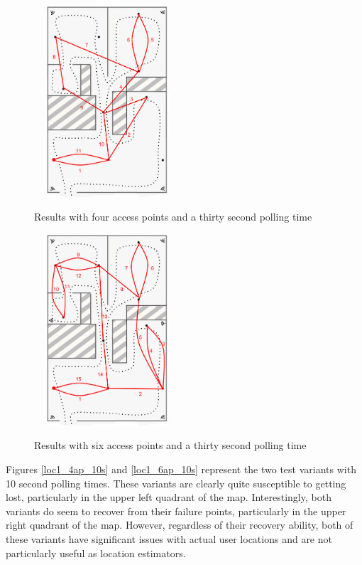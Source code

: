 \begin{figure}
	\centering
	\begin{minipage}{0.45\textwidth}
		\ \includegraphics[width=2in,height=2.8in]{loc1_4ap_30s.png}
		\caption{Results with four access points and a thirty second polling time}
		\label{loc1_4ap_30s}
	\end{minipage}\hfill
	\begin{minipage}{0.45\textwidth}
		\centering
		\ \includegraphics[width=2in,height=2.8in]{loc1_6ap_30s.png}
		\caption{Results with six access points and a thirty second polling time}
		\label{loc1_6ap_30s}
	\end{minipage}
\end{figure}


Figures \ref{loc1_4ap_10s} and \ref{loc1_6ap_10s} represent the two test variants with 10 second polling times. These variants are clearly quite susceptible to getting lost, particularly in the upper left quadrant of the map. Interestingly, both variants do seem to recover from their failure points, particularly in the upper right quadrant of the map. However, regardless of their recovery ability, both of these variants have significant issues with actual user locations and are not particularly useful as location estimators. 


